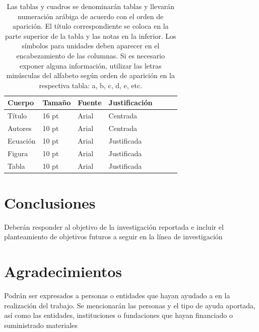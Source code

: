 \documentclass[9pt]{article}
\begin{document}
\begin{table}[H]

\caption{Las tablas y cuadros se denominarán tablas y llevarán numeración arábiga de acuerdo con el orden de aparición. El título correspondiente se coloca en la parte superior de la tabla y las notas en la inferior. Los símbolos para unidades deben aparecer en el encabezamiento de las columnas. Si es necesario exponer alguna información, utilizar las letras minúsculas del alfabeto según orden de aparición en la respectiva tabla: a, b, c, d, e, etc.}

\begin{tabular}{lllllll} 
\toprule
\textbf{Cuerpo}                          & \textbf{Tamaño} & \textbf{Fuente} & \textbf{Justificación}  \\ 
\hline
Título                                   & 16 pt           & Arial       & Centrada          \\ 
\hline
\rowcolor[rgb]{0.753,0.753,0.753} Autores & 10 pt           & Arial       & Centrada               \\ 
\hline
Ecuación                                   & 10 pt            & Arial   & Justificada         \\
\hline
\rowcolor[rgb]{0.753,0.753,0.753}Figura                                   & 10 pt            & Arial   & Justificada         \\
\hline
Tabla                                   & 10 pt            & Arial   & Justificada         \\
\bottomrule
\end{tabular}
\label{Tab:Ejemplo_Tabla}
\end{table}


\section*{Conclusiones}

Deberán responder al objetivo de la investigación reportada e incluir el planteamiento de objetivos futuros a seguir en la línea de investigación

\section*{Agradecimientos}

Podrán ser expresados a personas o entidades que hayan ayudado a en la realización del trabajo. Se mencionarán las personas y el tipo de ayuda aportada, así como las entidades, instituciones o fundaciones que hayan financiado o suministrado materiales
\end{document}
